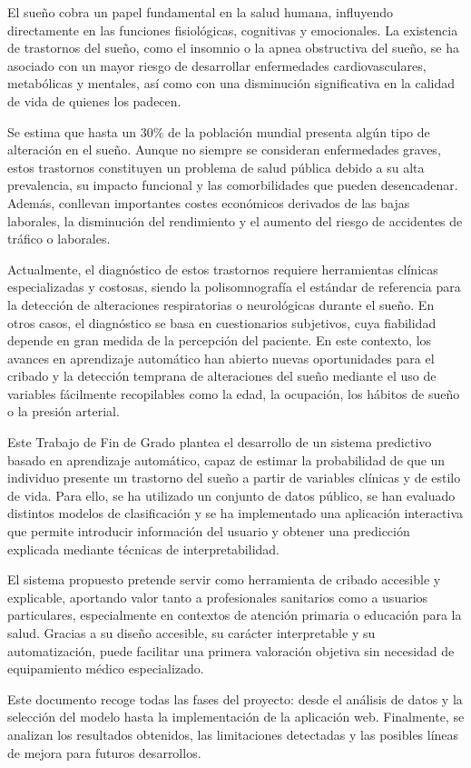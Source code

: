 
El sueño cobra un papel fundamental en la salud humana, influyendo directamente en las funciones fisiológicas, cognitivas y emocionales. La existencia de trastornos del sueño, como el insomnio o la apnea obstructiva del sueño, se ha asociado con un mayor riesgo de desarrollar enfermedades cardiovasculares, metabólicas y mentales, así como con una disminución significativa en la calidad de vida de quienes los padecen.

Se estima que hasta un 30\% de la población mundial presenta algún tipo de alteración en el sueño. Aunque no siempre se consideran enfermedades graves, estos trastornos constituyen un problema de salud pública debido a su alta prevalencia, su impacto funcional y las comorbilidades que pueden desencadenar. Además, conllevan importantes costes económicos derivados de las bajas laborales, la disminución del rendimiento y el aumento del riesgo de accidentes de tráfico o laborales.


Actualmente, el diagnóstico de estos trastornos requiere herramientas clínicas especializadas y costosas, siendo la polisomnografía el estándar de referencia para la detección de alteraciones respiratorias o neurológicas durante el sueño. En otros casos, el diagnóstico se basa en cuestionarios subjetivos, cuya fiabilidad depende en gran medida de la percepción del paciente. En este contexto, los avances en aprendizaje automático han abierto nuevas oportunidades para el cribado y la detección temprana de alteraciones del sueño mediante el uso de variables fácilmente recopilables como la edad, la ocupación, los hábitos de sueño o la presión arterial.


Este Trabajo de Fin de Grado plantea el desarrollo de un sistema predictivo basado en aprendizaje automático, capaz de estimar la probabilidad de que un individuo presente un trastorno del sueño a partir de variables clínicas y de estilo de vida. Para ello, se ha utilizado un conjunto de datos público, se han evaluado distintos modelos de clasificación y se ha implementado una aplicación interactiva que permite introducir información del usuario y obtener una predicción explicada mediante técnicas de interpretabilidad.

El sistema propuesto pretende servir como herramienta de cribado accesible y explicable, aportando valor tanto a profesionales sanitarios como a usuarios particulares, especialmente en contextos de atención primaria o educación para la salud. Gracias a su diseño accesible, su carácter interpretable y su automatización, puede facilitar una primera valoración objetiva sin necesidad de equipamiento médico especializado.

Este documento recoge todas las fases del proyecto: desde el análisis de datos y la selección del modelo hasta la implementación de la aplicación web. Finalmente, se analizan los resultados obtenidos, las limitaciones detectadas y las posibles líneas de mejora para futuros desarrollos.